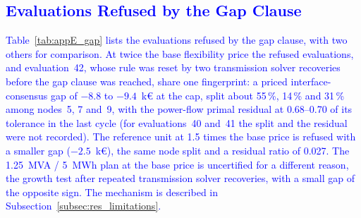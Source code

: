 \documentclass[preprint,12pt]{elsarticle}
\begin{document}
\subsection{\textcolor{blue}{Evaluations Refused by the Gap Clause}}
\label{app:results_gap}

\textcolor{blue}{
    Table~\ref{tab:appE_gap} lists the evaluations refused by the gap clause, with two others for comparison. At twice the base flexibility price the refused evaluations, and evaluation~42, whose rule was reset by two transmission solver recoveries before the gap clause was reached, share one fingerprint: a priced interface-consensus gap of $-8.8$ to $-9.4$~k\euro{} at the cap, split about 55\,\%, 14\,\% and 31\,\% among nodes~5, 7 and~9, with the power-flow primal residual at 0.68--0.70 of its tolerance in the last cycle (for evaluations~40 and~41 the split and the residual were not recorded). The reference unit at 1.5 times the base price is refused with a smaller gap ($-2.5$~k\euro), the same node split and a residual ratio of 0.027. The 1.25~MVA / 5~MWh plan at the base price is uncertified for a different reason, the growth test after repeated transmission solver recoveries, with a small gap of the opposite sign. The mechanism is described in Subsection~\ref{subsec:res_limitations}.
}
\end{document}
